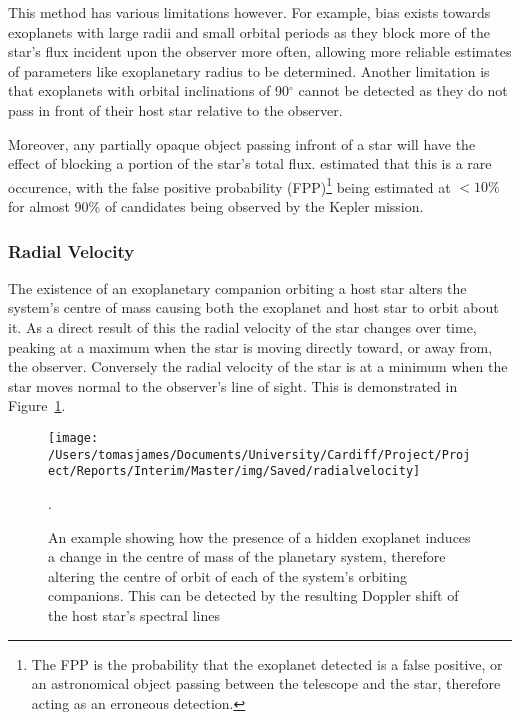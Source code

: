 \documentclass{article}
\begin{document}
This method has various limitations however. For example, bias exists towards exoplanets with large radii and small orbital periods as they block more of the star’s flux incident upon the observer more often, allowing more reliable estimates of parameters like exoplanetary radius to be determined. Another limitation is that exoplanets with orbital inclinations of 90$^\circ$ cannot be detected as they do not pass in front of their host star relative to the observer.

Moreover, any partially opaque object passing infront of a star will have the effect of blocking a portion of the star's total flux. \textcite{false} estimated that this is a rare occurence, with the false positive probability (FPP)\footnote{The FPP is the probability that the exoplanet detected is a false positive, or an astronomical object passing between the telescope and the star, therefore acting as an erroneous detection.} being estimated at $<10\%$ for almost 90\% of candidates being observed by the Kepler mission.

\subsubsection{Radial Velocity
}
The existence of an exoplanetary companion orbiting a host star alters the system's centre of mass causing both the exoplanet and host star to orbit about it. As a direct result of this the radial velocity of the star changes over time, peaking at a maximum when the star is moving directly toward, or away from, the observer. Conversely the radial velocity of the star is at a minimum when the star moves normal to the observer’s line of sight. This is demonstrated in Figure~\ref{rvdetect}.

\begin{figure}
\centering
    \texttt{[image: /Users/tomasjames/Documents/University/Cardiff/Project/Project/Reports/Interim/Master/img/Saved/radialvelocity]}
\caption[An example showing how the presence of a hidden exoplanet induces a change in the centre of mass of the planetary system, therefore altering the centre of orbit of each of the system's orbiting companions. This can be detected by the resulting Doppler shift of the host star's spectral lines.] {An example showing how the presence of a hidden exoplanet induces a change in the centre of mass of the planetary system, therefore altering the centre of orbit of each of the system's orbiting companions. This can be detected by the resulting Doppler shift of the host star's spectral lines \parencite{rvdetect}}.\label{rvdetect}
\end{figure}
\end{document}
